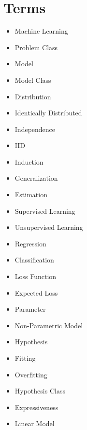 
\pagebreak

    \section{Terms}
    
        \begin{itemize}
            \item Machine Learning
            \item Problem Class
            \item Model
            \item Model Class
            \item Distribution
            \item Identically Distributed
            \item Independence
            \item IID
            \item Induction
            \item Generalization
            \item Estimation
            \item Supervised Learning
            \item Unsupervised Learning
            \item Regression
            \item Classification
            \item Loss Function
            \item Expected Loss
            \item Parameter
            \item Non-Parametric Model
            \item Hypothesis
            \item Fitting
            \item Overfitting
            \item Hypothesis Class
            \item Expressiveness
            \item Linear Model
            
        \end{itemize}
    




        

